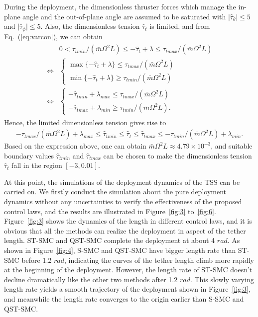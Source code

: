\documentclass[3p]{elsarticle}
\theoremstyle{plain}
\theoremstyle{remark}
\begin{document}
During the deployment, the dimensionless thruster forces which manage the in-plane angle and the out-of-plane angle are assumed to be saturated with $\vert\hat\tau_{\theta}\vert\le5 $ and $\vert\hat\tau_{\phi}\vert\le 5$. Also, the dimensionless tension $\hat\tau_t$ is limited, and from Eq.~(\ref{eq:varcon}), we can obtain
\begin{align}
\begin{split}
&0<\tau_{tmin}/(\bar{m}\Omega^2L)\le-\hat\tau_t+\lambda\le\tau_{tmax}/(\bar{m}\Omega^2L)\\
\Leftrightarrow
&\begin{cases}
\max\{-\hat\tau_t+\lambda\}\le\tau_{tmax}/(\bar{m}\Omega^2L)\\
\min\{-\hat\tau_t+\lambda\}\ge\tau_{tmin}/(\bar{m}\Omega^2L)
\end{cases}\\
\Leftrightarrow
&\begin{cases}
-\hat\tau_{tmin}+\lambda_{max}\le\tau_{tmax}/(\bar{m}\Omega^2L)\\
-\hat\tau_{tmax}+\lambda_{min}\ge\tau_{tmin}/(\bar{m}\Omega^2L).
\end{cases}
\end{split}
\end{align}
Hence, the limited dimensionless tension gives rise to
\begin{align}
-\tau_{tmax}/(\bar{m}\Omega^2L)+\lambda_{max}\le\hat\tau_{tmin}\le\hat\tau_t\le\hat\tau_{tmax}\le-\tau_{tmin}/(\bar{m}\Omega^2L)+\lambda_{min}.
\end{align}
Based on the expression above, one can obtain $\bar{m}\Omega^2L\approx 4.79\times 10^{-3}$, and suitable boundary values $\hat\tau_{tmin}$ and $\hat\tau_{tmax}$ can be chosen to make the dimensionless tension $\hat\tau_t$ fall in the region $[-3,0.01]$.\par
At this point, the simulations of the deployment dynamics of the TSS can be carried on. We firstly conduct the simulation about the pure deployment dynamics without any uncertainties to verify the effectiveness of the proposed control laws, and the results are illustrated in Figure~\ref{fig:3} to~\ref{fig:6}. Figure~\ref{fig:3} shows the dynamics of the length in different control laws, and it is obvious that all the methods can realize the deployment in aspect of the tether length. ST-SMC and QST-SMC complete the deployment at about 4 $rad$. As shown in Figure~\ref{fig:4}, S-SMC and QST-SMC have bigger length rate than ST-SMC before 1.2 $rad$, indicating the curves of the tether length climb more rapidly at the beginning of the deployment. However, the length rate of ST-SMC doesn't decline dramatically like the other two methods after 1.2 $rad$. This slowly varying length rate yields a smooth trajectory of the deployment shown in Figure~\ref{fig:3}, and meanwhile the length rate converges to the origin earlier than S-SMC and QST-SMC.\par
\end{document}
